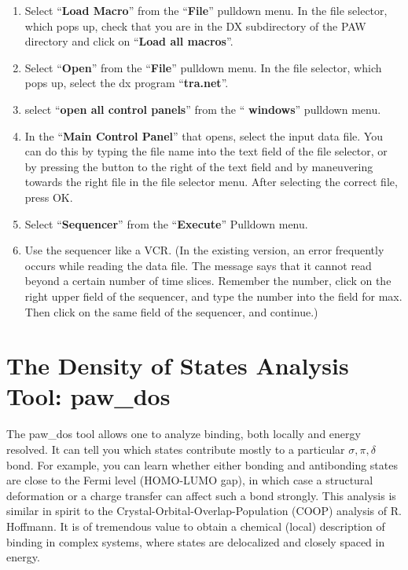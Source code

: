 \documentclass[final,12pt]{article}
\begin{document}
{{{{{{\bigskip{}\bigskip

\begin{enumerate}
\item Select ``{\bf Load Macro}'' from the ``{\bf File}'' pulldown
  menu. In the file selector, which pops up, check that you are in
  the DX subdirectory of the PAW directory and click on ``{\bf Load
    all macros}''.
\item Select ``{\bf Open}'' from the ``{\bf File}'' pulldown menu. In the file
  selector, which pops up, select the dx program ``{\bf tra.net}''.
\item select ``{\bf open all control panels}'' from the ``{\bf
    windows}'' pulldown menu.
\item In the ``{\bf Main Control Panel}'' that opens, select the input
  data file. You can do this by typing the file name into the text
  field of the file selector, or by pressing the button to the right of
  the text field and by maneuvering towards the right file in the
  file selector menu. After selecting the correct file, press OK.
\item Select ``{\bf Sequencer}'' from the ``{\bf Execute}'' Pulldown menu.
\item Use the sequencer like a VCR. (In the existing version, an error
  frequently occurs while reading the data file. The message says that it
  cannot read beyond a certain number of time slices. Remember the
  number, click on the right upper field of the sequencer, and type the
  number into the field for max. Then click on the same field of the
  sequencer, and continue.)
\end{enumerate}

\newpage
\section{The Density of States Analysis Tool: paw\_dos}
The paw\_dos tool allows one to analyze binding, both locally and energy
resolved. It can tell you which states contribute mostly to a
particular $\sigma, \pi, \delta$ bond. For example, you can learn whether
either bonding and antibonding states are close to the Fermi level
(HOMO-LUMO gap), in which case a structural deformation or a charge
transfer can affect such a bond strongly. This analysis is similar in
spirit to the Crystal-Orbital-Overlap-Population (COOP) analysis of R.
Hoffmann. It is of tremendous value to obtain a chemical (local)
description of binding in complex systems, where states are
delocalized and closely spaced in energy.

}}}}}}
\end{document}
